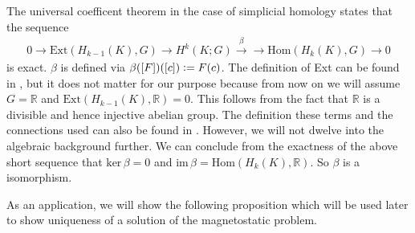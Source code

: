 \documentclass[12pt,a4paper]{article}
\theoremstyle{definition}
\newcommand{\real}{\mathbb{R}}
\begin{document}
The universal coefficent theorem in the case of simplicial homology states
that the sequence 
\begin{align}
    0 \rightarrow \text{Ext}(H_{k-1}(K),G) \rightarrow 
    H^k(K;G) \xrightarrow{\beta} \rightarrow \text{Hom}(H_k(K),G) 
    \rightarrow 0 \label{univeral_coefficient_theorem}
\end{align}
is exact. 
$\beta$ is defined via $\beta([F])([c]) \vcentcolon= F(c)$.
The definition of Ext can be found in \cite{topology_and_geometry},
but it does not matter for our purpose because from now on we will assume
$G = \real$ and
$\text{Ext}(H_{k-1}(K),\real) = 0$. This follows from the fact that 
$\real$ is a divisible and hence injective abelian group. The definition 
these terms and the connections used can also be found in 
\cite[Ch.\,V.6]{topology_and_geometry}. However, we will not dwelve into the 
algebraic background further. We can conclude from the exactness of the 
above short sequence that $\text{ker}\,\beta = 0$ and 
$\text{im}\,\beta = \text{Hom}(H_k(K),\real)$. So $\beta$ is a isomorphism.


As an application, we will show the following proposition which will be used
later to show uniqueness of a solution of the magnetostatic problem.
\end{document}

